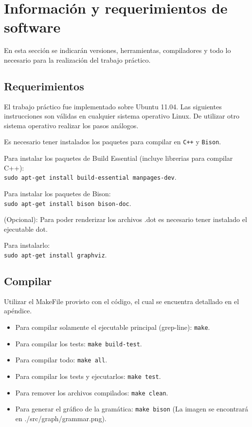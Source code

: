 \section{Información y requerimientos de software}

En esta sección se indicarán versiones, herramientas, compiladores y todo lo 
necesario para la realización del trabajo práctico.

\subsection{Requerimientos}

El trabajo práctico fue implementado sobre Ubuntu 11.04. Las siguientes instrucciones
 son válidas en cualquier sistema operativo Linux. De utilizar otro sistema 
 operativo realizar los pasos análogos.

Es necesario tener instalados los paquetes para compilar en \texttt{C++} y \texttt{Bison}.

Para instalar los paquetes de Build Essential (incluye librerias para compilar C++):\\
\texttt{sudo apt-get install build-essential manpages-dev}.

Para instalar los paquetes de Bison:\\
\texttt{sudo apt-get install bison bison-doc}.

(Opcional): Para poder renderizar los archivos .dot es necesario tener instalado el ejecutable dot. 

Para instalarlo:\\
\texttt{sudo apt-get install graphviz}.

\subsection{Compilar}

Utilizar el MakeFile provisto con el código, el cual se encuentra detallado en el apéndice.

\begin{itemize}

 \item Para compilar solamente el ejecutable principal (grep-line): \texttt{make}.

 \item Para compilar los tests: \texttt{make build-test}.
 
 \item Para compilar todo: \texttt{make all}.

 \item Para compilar los tests y ejecutarlos: \texttt{make test}.

 \item Para remover los archivos compilados: \texttt{make clean}. 

 \item Para generar el gráfico de la gramática: \texttt{make bison} (La imagen se encontrará en ./src/graph/grammar.png).

\end{itemize}

